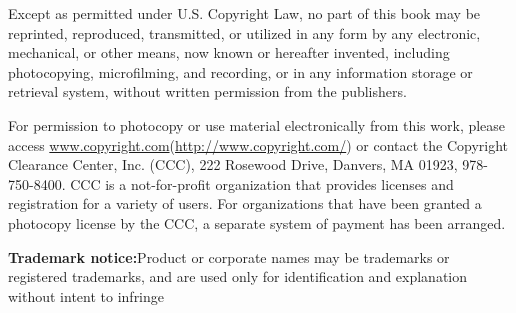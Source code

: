 \documentclass[11pt,openany,executivepaper]{book}
\begin{document}
Except as permitted under U.S. Copyright Law, no part of this book may be reprinted, reproduced, transmitted, or utilized in any form by any electronic, mechanical, or other means, now known or hereafter invented, including photocopying, microfilming, and recording, or in any information storage or retrieval system, without written permission from the publishers.

For permission to photocopy or use material electronically from this work, please access \href{http://www.copyright.com/}{www.copyright.com}(\url{http://www.copyright.com/}) or contact the Copyright Clearance Center, Inc. (CCC), 222 Rosewood Drive, Danvers, MA 01923, 978-750-8400. CCC is a not-for-profit organization that provides licenses and registration for a variety of users. For organizations that have been granted a photocopy license by the CCC, a separate system of payment has been arranged.

\textbf{Trademark notice:}Product or corporate names may be trademarks or registered trademarks, and are used only for identification and explanation without intent to infringe
\end{document}
